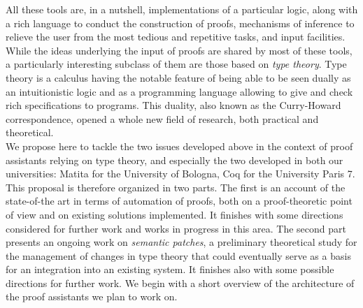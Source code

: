 \documentclass[twoside,a4paper,12pt]{article}
\begin{document}
All these tools are, in a nutshell, implementations of a particular
logic, along with a rich language to conduct the construction of
proofs, mechanisms of inference to relieve the user from the most
tedious and repetitive tasks, and input facilities. While the ideas
underlying the input of proofs are shared by most of these tools, a
particularly interesting subclass of them are those based on
\emph{type theory}. Type theory is a calculus having the notable
feature of being able to be seen dually as an intuitionistic logic and
as a programming language allowing to give and check rich
specifications to programs. This duality, also known as the
Curry-Howard correspondence, opened a whole new field of research,
both practical and theoretical.
\\[-0.5em]

We propose here to tackle the two issues developed above in the
context of proof assistants relying on type theory, and especially the
two developed in both our universities: \textsf{Matita} for the
University of Bologna, \textsf{Coq} for the University Paris 7. 
This proposal is therefore organized in
two parts.
The first
is an account of the state-of-the art in terms of automation of
proofs, both on a proof-theoretic point of view and on existing
solutions implemented.  It finishes with some directions considered
for further work and works in progress in this area. 
The second part
presents an ongoing work on \emph{semantic patches}, a preliminary
theoretical study for the management of changes in type theory that
could eventually serve as a basis for an integration into an existing
system. It finishes also with some possible directions for further
work.
We begin with a short overview of the architecture of the proof
assistants we plan to work on.

\newpage
{}


\end{document}
